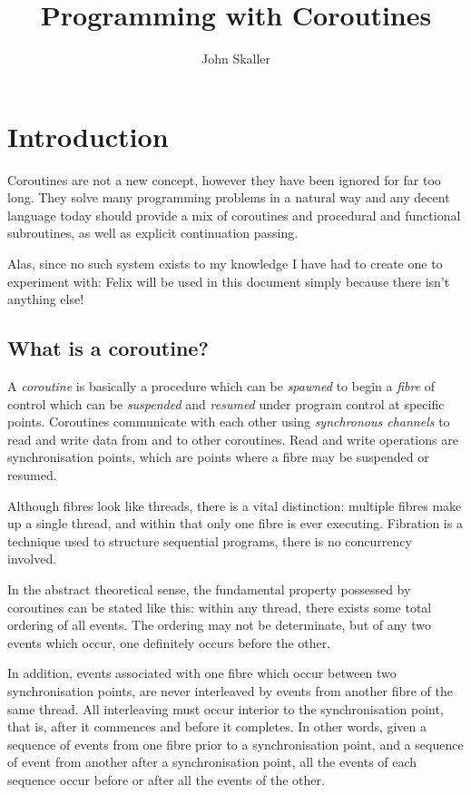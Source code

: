 \documentclass[oneside]{book}
\title{Programming with Coroutines}
\author{John Skaller}
\begin{document}
\maketitle
\tableofcontents
\chapter{Introduction}
Coroutines are not a new concept, however they have been ignored for
far too long. They solve many programming problems in a natural way and
any decent language today should provide a mix of coroutines and procedural
and functional subroutines, as well as explicit continuation passing.

Alas, since no such system exists to my knowledge I have had to create
one to experiment with: Felix will be used in this document simply
because there isn't anything else!

\section{What is a coroutine?}
A {\em coroutine} is basically a procedure which can be {\em spawned} to begin
a {\em fibre} of control which can be {\em suspended} and {\em resumed} under program
control at specific points. Coroutines communicate with each other
using {\em synchronous channels} to read and write data from and to other
coroutines. Read and write operations are synchronisation points,
which are points where a fibre may be suspended or resumed.

Although fibres look like threads, there is a vital distinction: multiple
fibres make up a single thread, and within that only one fibre is ever
executing. Fibration is a technique used to structure sequential programs,
there is no concurrency involved.

In the abstract theoretical sense, the fundamental property possessed by
coroutines can be stated like this: within any thread, there exists some
total ordering of all events. The ordering may not be determinate, but of any two
events which occur, one definitely occurs before the other.

In addition, events associated with one fibre which occur between two synchronisation
points, are never interleaved by events from another fibre of the same thread.
All interleaving must occur interior to the synchronisation point, that is,
after it commences and before it completes. In other words, given a sequence
of events from one fibre prior to a synchronisation point, and a sequence of
event from another after a synchronisation point, all the events of each
sequence occur before or after all the events of the other.
\end{document}
